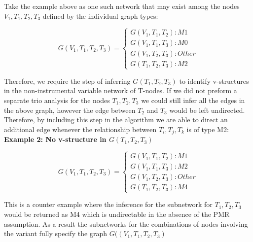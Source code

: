 \documentclass[12pt]{report}
\begin{document}
Take the example above as one such network that may exist among the nodes $V_1, T_1, T_2, T_3$ defined by the individual graph types:

\[ G(V_1, T_1, T_2, T_3)=\begin{cases}G(V_1,T_1,T_2):M1 \\ G(V_1, T_1,T_3):M0 \\ G(V_1, T_2,T_3):Other \\  G(T_1,T_2,T_3):M2 \end{cases}\]

Therefore, we require the step of inferring $G(T_1, T_2, T_3)$ to identify v-structures in the non-instrumental variable network of T-nodes. If we did not preform a separate trio analysis for the nodes $T_1, T_2, T_3$ we could still infer all the edges in the above graph, however the edge between $T_2$ and $T_3$ would be left undirected. Therefore, by including this step in the algorithm we are able to direct an additional edge whenever the relationship between $T_i, T_j, T_k$ is of type M2:\\

\textbf{Example 2: No v-structure in $G(T_1, T_2, T_3)$}

\begin{center}
\end{center}

\[ G(V_1, T_1, T_2, T_3)=\begin{cases}G(V_1,T_1,T_2):M1 \\ G(V_1, T_1,T_3):M2 \\ G(V_1, T_2,T_3):Other \\ G(T_1, T_2, T_3):M4 \end{cases}\]

This is a counter example where the inference for the subnetwork for $T_1, T_2, T_3$ would be returned as M4 which is undirectable in the absence of the PMR assumption. As a result the subnetworks for the combinations of nodes involving the variant fully specify the graph $G((V_1, T_1, T_2, T_3)$\\
\end{document}

